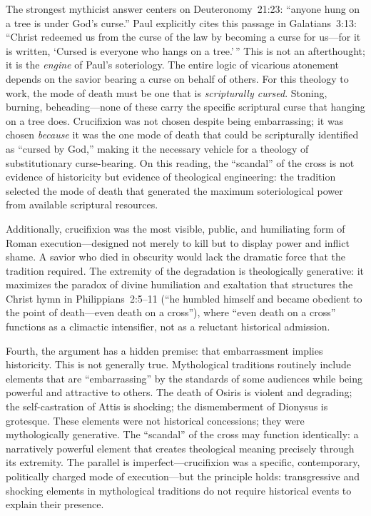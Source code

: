 \documentclass[12pt,oneside]{article}
\begin{document}
The strongest mythicist answer centers on Deuteronomy~21:23: ``anyone
hung on a tree is under God's curse.''  Paul explicitly cites this
passage in Galatians~3:13: ``Christ redeemed us from the curse of the
law by becoming a curse for us---for it is written, `Cursed is everyone
who hangs on a tree.'\,''  This is not an afterthought; it is the
\textit{engine} of Paul's soteriology.  The entire logic of vicarious
atonement depends on the savior bearing a curse on behalf of others.
For this theology to work, the mode of death must be one that is
\textit{scripturally cursed}.  Stoning, burning, beheading---none of
these carry the specific scriptural curse that hanging on a tree does.
Crucifixion was not chosen despite being embarrassing; it was chosen
\textit{because} it was the one mode of death that could be scripturally
identified as ``cursed by God,'' making it the necessary vehicle for a
theology of substitutionary curse-bearing.  On this reading, the
``scandal'' of the cross is not evidence of historicity but evidence of
theological engineering: the tradition selected the mode of death that
generated the maximum soteriological power from available scriptural
resources.

Additionally, crucifixion was the most visible, public, and humiliating
form of Roman execution---designed not merely to kill but to display
power and inflict shame.  A savior who died in obscurity would lack
the dramatic force that the tradition required.  The extremity of the
degradation is theologically generative: it maximizes the paradox of
divine humiliation and exaltation that structures the Christ hymn in
Philippians~2:5--11 (``he humbled himself and became obedient to the
point of death---even death on a cross''), where ``even death on a
cross'' functions as a climactic intensifier, not as a reluctant
historical admission.

Fourth, the argument has a hidden premise: that embarrassment implies
historicity.  This is not generally true.  Mythological traditions
routinely include elements that are ``embarrassing'' by the standards of
some audiences while being powerful and attractive to others.  The death
of Osiris is violent and degrading; the self-castration of Attis is
shocking; the dismemberment of Dionysus is grotesque.  These elements
were not historical concessions; they were mythologically generative.
The ``scandal'' of the cross may function identically: a narratively
powerful element that creates theological meaning precisely through its
extremity.  The parallel is imperfect---crucifixion was a specific,
contemporary, politically charged mode of execution---but the principle
holds: transgressive and shocking elements in mythological traditions
do not require historical events to explain their presence.
\end{document}
